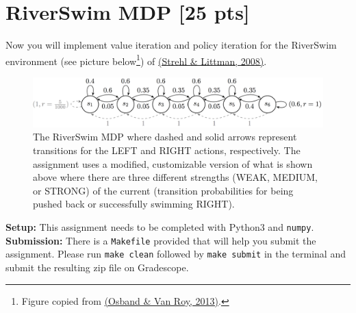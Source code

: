 \section{RiverSwim MDP [25 pts]}
Now you will implement value iteration and policy iteration for the RiverSwim environment (see picture below\footnote{Figure copied from \href{https://proceedings.neurips.cc/paper/2013/hash/6a5889bb0190d0211a991f47bb19a777-Abstract.html}{(Osband \& Van Roy, 2013)}.}) of \href{https://www.sciencedirect.com/science/article/pii/S0022000008000767}{(Strehl \& Littman, 2008)}.
\begin{figure}[h]
    \centering
    \includegraphics[width=\linewidth]{RiverSwim.png}
    \caption{The RiverSwim MDP where dashed and solid arrows represent transitions for the \textsc{LEFT} and \textsc{RIGHT} actions, respectively. The assignment uses a modified, customizable version of what is shown above where there are three different strengths (\textsc{WEAK}, \textsc{MEDIUM}, or \textsc{STRONG}) of the current (transition probabilities for being pushed back or successfully swimming \textsc{RIGHT}).}
    \label{fig:riverswim}
\end{figure}

\noindent \textbf{Setup:} This assignment needs to be completed with Python3 and \texttt{numpy}. 
\\

\noindent \textbf{Submission:} There is a \texttt{Makefile} provided that will help you submit the assignment. Please run \texttt{make clean} followed by \texttt{make submit} in the terminal and submit the resulting zip file on Gradescope.


